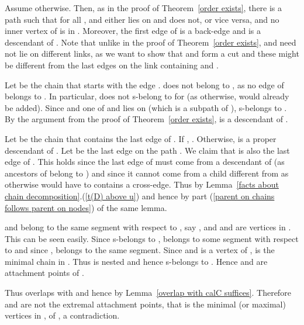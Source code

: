 \documentclass[paper=a4]{scrartcl}
\newcommand{\qed}{}
\newcommand{\mqed}{\hfill}
\newlength{\proofpostskipamount}\newlength{\proofpreskipamount}
\newenvironment{proof}{\par\vspace{\proofpreskipamount}\noindent{\textbf{Proof:}}\hspace{0.5em}}{\nopagebreak \strut\nopagebreak \hspace{\fill}\mqed\par\vspace{\proofpostskipamount}\noindent}
\begin{document}
\begin{proof}
Assume otherwise. Then, as in the proof of Theorem~\ref{order exists}, there is a path  such that  for all , and either  lies on  and  does not, or vice versa, and no inner vertex of  is in . Moreover, the first edge  of  is a back-edge and  is a descendant of . Note that unlike in the proof of  Theorem~\ref{order exists},  and  need not lie on different links, as we want to show that  and  form a cut and these might be different from the last edges on the link containing  and .

Let  be the chain that starts with the edge .  does not belong to , as no edge of  belongs to . In particular,  does not s-belong to  for  (as otherwise,  would already be added). Since  and one of  and  lies on  (which is a subpath of ),  s-belongs to . By the argument from the proof of Theorem~\ref{order exists},  is a descendant of .

Let  be the chain that contains the last edge of . If , . Otherwise,  is a proper descendant of . Let  be the last edge on the path .  We claim that  is also the last edge of . This holds since the last edge of  must come from a descendant of  (as ancestors of  belong to ) and since it cannot come from a child different from  as otherwise  would have to contains a cross-edge. Thus  by Lemma~\ref{facts about chain decomposition}.(\ref{t(D) above u}) and hence  by part (\ref{parent on chains follows parent on nodes}) of the same lemma.

 and  belong to the same segment with respect to , say , and  and  are vertices in . This can be seen easily. Since  s-belongs to ,  belongs to some segment with respect to  and since ,  belongs to the same segment. Since  and  is a vertex of ,  is the minimal chain in . Thus  is nested and hence  s-belongs to . Hence  and  are attachment points of .

Thus  overlaps with  and hence  by Lemma~\ref{overlap with calC suffices}. Therefore  and  are not the extremal attachment points, that is the minimal (or maximal) vertices in , of , a contradiction. \qed
\end{proof}
\end{document}
